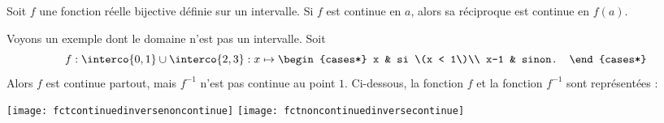 \begin{frame}%
  \begin{proposition}
    Soit \(f\) une fonction réelle bijective définie sur un intervalle. Si \(f\) est continue en \(a\), alors sa réciproque est continue en \(f(a)\).
  \end{proposition}%
\end{frame}

\begin{frame}
  \begin{example}%
    Voyons un exemple dont le domaine n'est pas un intervalle. Soit
    \begin{equation*}
      f : \interco{0,1}\cup \interco{2,3} : x \mapsto
      \begin{cases*}
        x & si \(x < 1\)\\
        x-1 & sinon.
      \end{cases*}
    \end{equation*}
    Alors \(f\) est continue partout, mais \(f^{-1}\) n'est pas continue au point \(1\). Ci-dessous, la fonction \(f\) et la fonction \(f^{-1}\) sont représentées :
    \begin{center}
      \texttt{[image: fctcontinuedinversenoncontinue]}
      \quad
      \texttt{[image: fctnoncontinuedinversecontinue]}
    \end{center}
  \end{example}
\end{frame}
